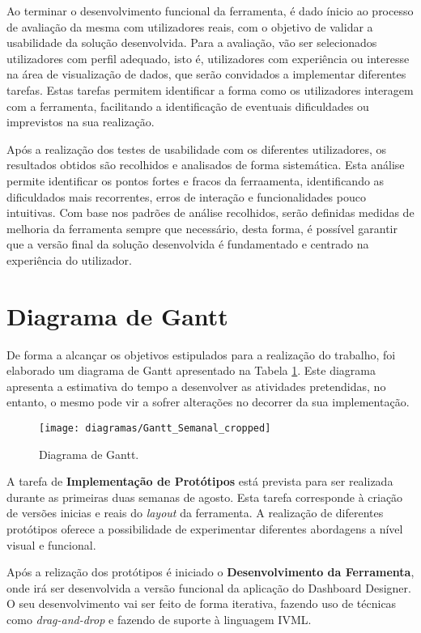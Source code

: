 Ao terminar o desenvolvimento funcional da ferramenta, é dado ínicio ao processo de avaliação da mesma com utilizadores reais, com o objetivo de validar a usabilidade da solução desenvolvida. Para a avaliação, vão ser selecionados utilizadores com perfil adequado, isto é, utilizadores com experiência ou interesse na área de visualização de dados, que serão convidados a implementar diferentes tarefas. Estas tarefas permitem identificar a forma como os utilizadores interagem com a ferramenta, facilitando a identificação de eventuais dificuldades ou imprevistos na sua realização.

Após a realização dos testes de usabilidade com os diferentes utilizadores, os resultados obtidos são recolhidos e analisados de forma sistemática. Esta análise permite identificar os pontos fortes e fracos da ferraamenta, identificando as dificuldados mais recorrentes, erros de interação e funcionalidades pouco intuitivas. Com base nos padrões de análise recolhidos, serão definidas medidas de melhoria da ferramenta sempre que necessário, desta forma, é possível garantir que a versão final da solução desenvolvida é fundamentado e centrado na experiência do utilizador.

\section{Diagrama de Gantt} %
\label{sec:ganttchart}

De forma a alcançar os objetivos estipulados para a realização do trabalho, foi elaborado um diagrama de Gantt apresentado na Tabela \ref{tab:ganttchart}. Este diagrama apresenta a estimativa do tempo a desenvolver as atividades pretendidas, no entanto, o mesmo pode vir a sofrer alterações no decorrer da sua implementação.

\begin{figure}[htbp]
  \texttt{[image: diagramas/Gantt\_Semanal\_cropped]}
  \centering
  \caption{Diagrama de Gantt.}
  \label{tab:ganttchart}
\end{figure}

A tarefa de \textbf{Implementação de Protótipos} está prevista para ser realizada durante as primeiras duas semanas de agosto. Esta tarefa corresponde à criação de versões inicias e reais do \textit{layout} da ferramenta. A realização de diferentes protótipos oferece a possibilidade de experimentar diferentes abordagens a nível visual e funcional.

Após a relização dos protótipos é iniciado o \textbf{Desenvolvimento da Ferramenta}, onde irá ser desenvolvida a versão funcional da aplicação do Dashboard Designer. O seu desenvolvimento vai ser feito de forma iterativa, fazendo uso de técnicas como \textit{drag-and-drop} e fazendo de suporte à linguagem \gls{IVML}.

